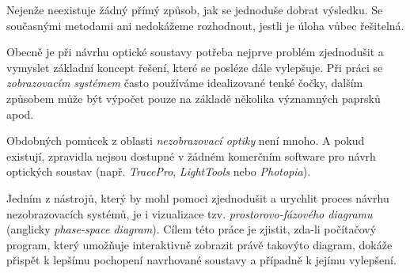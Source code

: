 Nejenže neexistuje žádný přímý způsob, jak se jednoduše dobrat výsledku. Se současnými metodami ani nedokážeme rozhodnout, jestli je úloha vůbec řešitelná.\src

Obecně je při návrhu optické soustavy potřeba nejprve problém zjednodušit a vymyslet základní koncept řešení, které se posléze dále vylepšuje. Při práci se \emph{zobrazovacím systémem} často používáme idealizované tenké čočky, dalším způsobem může být výpočet pouze na základě několika významných paprsků apod.

Obdobných pomůcek z oblasti \emph{nezobrazovací optiky} není mnoho. A pokud existují, zpravidla nejsou dostupné v žádném komerčním software pro návrh optických soustav (např. \emph{TracePro}, \emph{LightTools} nebo \emph{Photopia}).\src

Jedním z nástrojů, který by mohl pomoci zjednodušit a urychlit proces návrhu nezobrazovacích systémů, je i vizualizace tzv. \emph{prostorovo-fázového diagramu} (anglicky \emph{phase-space diagram}). Cílem této práce je zjistit, zda-li počítačový program, který umožňuje interaktivně zobrazit právě takovýto diagram, dokáže přispět k lepšímu pochopení navrhované soustavy a případně k jejímu vylepšení.